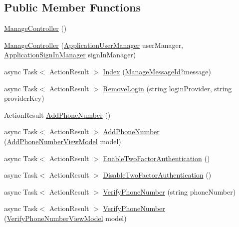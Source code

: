 \subsection*{Public Member Functions}
\begin{DoxyCompactItemize}
\item 
\hyperlink{class_bibabook_1_1_controllers_1_1_manage_controller_a8a7d195592a7eae6792e15d4424691d2}{Manage\+Controller} ()
\item 
\hyperlink{class_bibabook_1_1_controllers_1_1_manage_controller_a9b1fa818676229e55134c567736c5a5c}{Manage\+Controller} (\hyperlink{class_bibabook_1_1_application_user_manager}{Application\+User\+Manager} user\+Manager, \hyperlink{class_bibabook_1_1_application_sign_in_manager}{Application\+Sign\+In\+Manager} sign\+In\+Manager)
\item 
async Task$<$ Action\+Result $>$ \hyperlink{class_bibabook_1_1_controllers_1_1_manage_controller_a560ba09d4a32d1a13b0b94500fa6fe8c}{Index} (\hyperlink{class_bibabook_1_1_controllers_1_1_manage_controller_a11520cf302554950f1aeac2bd8137403}{Manage\+Message\+Id}?message)
\item 
async Task$<$ Action\+Result $>$ \hyperlink{class_bibabook_1_1_controllers_1_1_manage_controller_ab81450b5dfbb9013c2f9a42e58caa541}{Remove\+Login} (string login\+Provider, string provider\+Key)
\item 
Action\+Result \hyperlink{class_bibabook_1_1_controllers_1_1_manage_controller_a760227d71f3ff5dd36f5d5c5cc5189da}{Add\+Phone\+Number} ()
\item 
async Task$<$ Action\+Result $>$ \hyperlink{class_bibabook_1_1_controllers_1_1_manage_controller_af1a3bf84009add5f0e16a048a078c08f}{Add\+Phone\+Number} (\hyperlink{class_bibabook_1_1_models_1_1_add_phone_number_view_model}{Add\+Phone\+Number\+View\+Model} model)
\item 
async Task$<$ Action\+Result $>$ \hyperlink{class_bibabook_1_1_controllers_1_1_manage_controller_a08577ea6c3251ca9d29d41f20a732a65}{Enable\+Two\+Factor\+Authentication} ()
\item 
async Task$<$ Action\+Result $>$ \hyperlink{class_bibabook_1_1_controllers_1_1_manage_controller_acd10d6fbc373d3788e4a66588cc292e0}{Disable\+Two\+Factor\+Authentication} ()
\item 
async Task$<$ Action\+Result $>$ \hyperlink{class_bibabook_1_1_controllers_1_1_manage_controller_ac3a72ec2be19a70a6df482757161004b}{Verify\+Phone\+Number} (string phone\+Number)
\item 
async Task$<$ Action\+Result $>$ \hyperlink{class_bibabook_1_1_controllers_1_1_manage_controller_a8968ba1b75d7ef1fb9254fa2fe8a12e1}{Verify\+Phone\+Number} (\hyperlink{class_bibabook_1_1_models_1_1_verify_phone_number_view_model}{Verify\+Phone\+Number\+View\+Model} model)

\end{DoxyCompactItemize}

